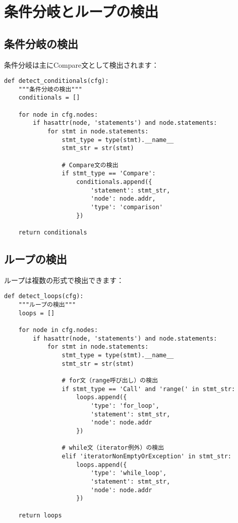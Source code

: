 \documentclass[12pt,a4paper]{article}
\begin{document}
\section{条件分岐とループの検出}

\subsection{条件分岐の検出}

条件分岐は主にCompare文として検出されます：

\begin{lstlisting}[caption=条件分岐の検出]
def detect_conditionals(cfg):
    """条件分岐の検出"""
    conditionals = []

    for node in cfg.nodes:
        if hasattr(node, 'statements') and node.statements:
            for stmt in node.statements:
                stmt_type = type(stmt).__name__
                stmt_str = str(stmt)

                # Compare文の検出
                if stmt_type == 'Compare':
                    conditionals.append({
                        'statement': stmt_str,
                        'node': node.addr,
                        'type': 'comparison'
                    })

    return conditionals
\end{lstlisting}

\subsection{ループの検出}

ループは複数の形式で検出できます：

\begin{lstlisting}[caption=ループの検出]
def detect_loops(cfg):
    """ループの検出"""
    loops = []

    for node in cfg.nodes:
        if hasattr(node, 'statements') and node.statements:
            for stmt in node.statements:
                stmt_type = type(stmt).__name__
                stmt_str = str(stmt)

                # for文（range呼び出し）の検出
                if stmt_type == 'Call' and 'range(' in stmt_str:
                    loops.append({
                        'type': 'for_loop',
                        'statement': stmt_str,
                        'node': node.addr
                    })

                # while文（iterator例外）の検出
                elif 'iteratorNonEmptyOrException' in stmt_str:
                    loops.append({
                        'type': 'while_loop',
                        'statement': stmt_str,
                        'node': node.addr
                    })

    return loops
\end{lstlisting}
\end{document}
